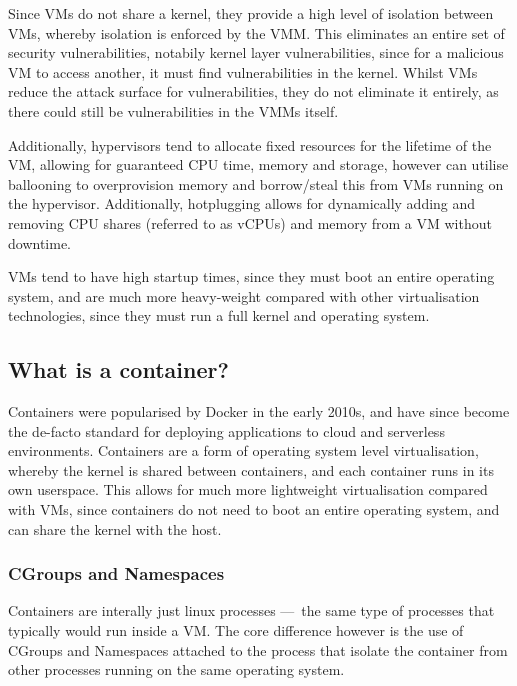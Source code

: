 Since VMs do not share a kernel, they provide a high level of isolation between VMs\cite{hoeferTaxonomyCloudComputing2010}, whereby isolation is enforced by the VMM. This eliminates an entire set of security vulnerabilities, notabily kernel layer vulnerabilities, since for a malicious VM to access another, it must find vulnerabilities in the kernel. Whilst VMs reduce the attack surface for vulnerabilities, they do not eliminate it entirely, as there could still be vulnerabilities in the VMMs itself\cite{reubenSurveyVirtualMachine,ramosjoaocarloscarvalhodossantosSecurityChallengesVirtualization2009}.

Additionally, hypervisors tend to allocate fixed resources for the lifetime of the VM, allowing for guaranteed CPU time, memory and storage\cite{hoeferTaxonomyCloudComputing2010}, however can utilise ballooning to overprovision memory and borrow/steal this from VMs running on the hypervisor\cite{moniruzzamanAnalysisMemoryBallooning2014}. Additionally, hotplugging\cite{hildenbrandVirtiomemParavirtualizedMemory2021,LKMLDanielKiper} allows for dynamically adding and removing CPU shares (referred to as vCPUs) and memory from a VM without downtime.

VMs tend to have high startup times\cite{haoEmpiricalAnalysisVM2021}, since they must boot an entire operating system, and are much more heavy-weight compared with other virtualisation technologies, since they must run a full kernel and operating system.

\subsection{What is a container?}
Containers were popularised by Docker\cite{DockerAcceleratedContainer2022} in the early 2010s, and have since become the de-facto standard\cite{vanoCloudNativeWorkloadOrchestration2023} for deploying applications to cloud and serverless environments. Containers are a form of operating system level virtualisation\cite{yadavDockerContainersVirtual2019}, whereby the kernel is shared between containers\cite{WhatContainerDockera}, and each container runs in its own userspace. This allows for much more lightweight virtualisation compared with VMs, since containers do not need to boot an entire operating system, and can share the kernel with the host\cite{potdarPerformanceEvaluationDocker2020}.

\subsubsection{CGroups and Namespaces}
Containers are interally just linux processes — the same type of processes that typically would run inside a VM. The core difference however is the use of CGroups and Namespaces\cite{rosenramiNamespacesCgroupsBasis2016} attached to the process that isolate the container from other processes running on the same operating system.

